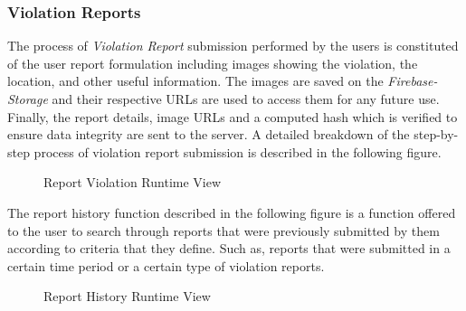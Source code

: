\subsubsection{Violation Reports}
The process of \emph{Violation Report} submission performed by the users is constituted of the user report formulation including images showing the violation, the location, and other useful information. The images are saved on the \emph{Firebase-Storage} and their respective URLs are used to access them for any future use. Finally, the report details, image URLs and a computed hash which is verified to ensure data integrity are sent to the server. A detailed breakdown of the step-by-step process of violation report submission is described in the following figure.

\begin{figure}[H]
\caption{Report Violation Runtime View}
\label{fig:RuntimeRep}
\centering

\end{figure}

The report history function described in the following figure is a function offered to the user to search through reports that were previously submitted by them according to criteria that they define. Such as, reports that were submitted in a certain time period or a certain type of violation reports.
\begin{sidewaysfigure}
\begin{figure}[H]
\caption{Report History Runtime View}
\label{fig:RuntimeHist}
\centering

\end{figure}
\end{sidewaysfigure}
